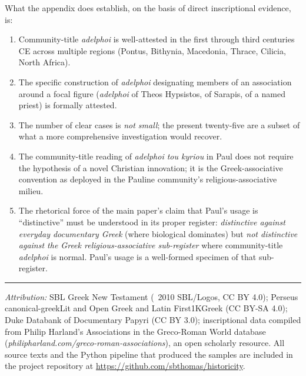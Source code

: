 \documentclass[11pt,oneside]{article}
\begin{document}
What the appendix does establish, on the basis of direct inscriptional
evidence, is:

\begin{enumerate}[leftmargin=1.5em]
\item Community-title \textit{adelphoi} is well-attested in the
  first through third centuries CE across multiple regions (Pontus,
  Bithynia, Macedonia, Thrace, Cilicia, North Africa).
\item The specific construction of \textit{adelphoi} designating
  members of an association around a focal figure
  (\textit{adelphoi} of Theos Hypsistos, of Sarapis, of a named
  priest) is formally attested.
\item The number of clear cases is \textit{not small}; the present
  twenty-five are a subset of what a more comprehensive
  investigation would recover.
\item The community-title reading of \textit{adelphoi tou kyriou} in
  Paul does not require the hypothesis of a novel Christian
  innovation; it is the Greek-associative convention as deployed in
  the Pauline community's religious-associative milieu.

\item The rhetorical force of the main paper's claim that Paul's
  usage is ``distinctive'' must be understood in its proper register:
  \textit{distinctive against everyday documentary Greek} (where
  biological dominates) but \textit{not distinctive against the
  Greek religious-associative sub-register} where community-title
  \textit{adelphoi} is normal.  Paul's usage is a well-formed
  specimen of that sub-register.
\end{enumerate}

\vspace{1em}
\noindent\rule{0.5\textwidth}{0.4pt}\par
\vspace{0.5em}
\small\noindent\textit{Attribution:} SBL Greek New Testament
(\textcopyright~2010 SBL/Logos, CC BY 4.0); Perseus canonical-greekLit
and Open Greek and Latin First1KGreek (CC BY-SA 4.0); Duke Databank of
Documentary Papyri (CC BY 3.0); inscriptional data compiled from
Philip Harland's Associations in the Greco-Roman World database
(\textit{philipharland.com/greco-roman-associations}), an open
scholarly resource.  All source texts and the Python pipeline that
produced the samples are included in the project repository at
\url{https://github.com/sbthomas/historicity}.
\end{document}
